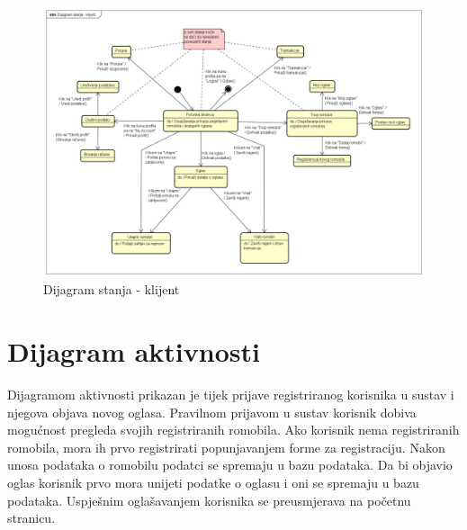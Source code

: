 \begin{figure} [H]

	\includegraphics[width=1\linewidth]{slike/StateDiagram.png}
	\centering
	\caption{Dijagram stanja - klijent}
	\label{fig:Dijagram stanja - klijent}
\end{figure}

\eject

\section{Dijagram aktivnosti}

Dijagramom aktivnosti prikazan je tijek prijave registriranog korisnika u sustav i njegova objava novog oglasa. Pravilnom prijavom u sustav korisnik dobiva mogućnost pregleda svojih registriranih romobila. Ako korisnik nema registriranih romobila, mora ih prvo registrirati popunjavanjem forme za registraciju. Nakon unosa podataka o romobilu podatci se spremaju u bazu podataka. Da bi objavio oglas korisnik prvo mora unijeti podatke o oglasu i oni se spremaju u bazu podataka. Uspješnim oglašavanjem korisnika se preusmjerava na početnu stranicu.

